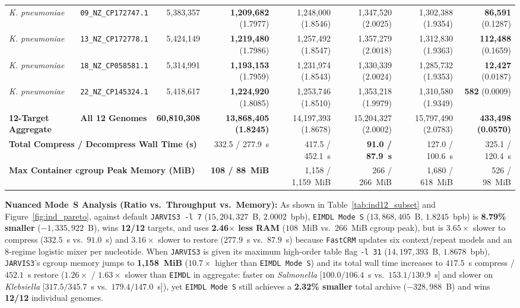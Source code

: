 \documentclass[10pt]{article}
\theoremstyle{definition}
\begin{document}
\begin{table}[h!]
{\begin{tabular}{llrrrrrr}
\textit{K. pneumoniae} & \texttt{09\_NZ\_CP172747.1} & 5,383,357 & \textbf{1,209,682} (1.7977) & 1,248,000 (1.8546) & 1,347,520 (2.0025) & 1,302,388 (1.9354) & \textbf{86,591} (0.1287) \\
\textit{K. pneumoniae} & \texttt{13\_NZ\_CP172778.1} & 5,424,149 & \textbf{1,219,480} (1.7986) & 1,257,492 (1.8547) & 1,357,279 (2.0018) & 1,312,830 (1.9363) & \textbf{112,488} (0.1659) \\
\textit{K. pneumoniae} & \texttt{18\_NZ\_CP058581.1} & 5,314,991 & \textbf{1,193,153} (1.7959) & 1,231,974 (1.8543) & 1,330,339 (2.0024) & 1,285,732 (1.9353) & \textbf{12,427} (0.0187) \\
\textit{K. pneumoniae} & \texttt{22\_NZ\_CP145324.1} & 5,418,617 & \textbf{1,224,920} (1.8085) & 1,253,746 (1.8510) & 1,353,218 (1.9979) & 1,310,580 (1.9349) & \textbf{582} (0.0009) \\
\midrule
\textbf{12-Target Aggregate} & \textbf{All 12 Genomes} & \textbf{60,810,308} & \textbf{13,868,405 (1.8245)} & 14,197,393 (1.8678) & 15,204,327 (2.0002) & 15,797,490 (2.0783) & \textbf{433,498 (0.0570)} \\
\midrule
\multicolumn{3}{l}{\textbf{Total Compress / Decompress Wall Time (s)}} & 332.5 / 277.9~s & 417.5 / 452.1~s & \textbf{91.0 / 87.9~s} & 127.0 / 100.6~s & 325.1 / 120.4~s \\
\multicolumn{3}{l}{\textbf{Max Container cgroup Peak Memory (MiB)}} & \textbf{108 / 88~MiB} & 1,158 / 1,159~MiB & 266 / 266~MiB & 1,680 / 618~MiB & 526 / 98~MiB \\
\bottomrule
\end{tabular}%
}
\end{table}

\noindent
\textbf{Nuanced Mode~S Analysis (Ratio vs.\ Throughput vs.\ Memory):}
As shown in Table~\ref{tab:ind12_subset} and Figure~\ref{fig:ind_pareto}, against default \texttt{JARVIS3 -l 7} ($15,204,327$~B, $2.0002$~bpb), \texttt{EIMDL Mode~S} ($13,868,405$~B, $1.8245$~bpb) is \textbf{8.79\% smaller} ($-1,335,922$~B), wins \textbf{12/12} targets, and uses \textbf{2.46$\times$ less RAM} ($108$~MiB vs.\ $266$~MiB cgroup peak), but is $3.65\times$ slower to compress ($332.5$~s vs.\ $91.0$~s) and $3.16\times$ slower to restore ($277.9$~s vs.\ $87.9$~s) because \texttt{FastCRM} updates six context/repeat models and an 8-regime logistic mixer per nucleotide. When \texttt{JARVIS3} is given its maximum high-order table flag \texttt{-l 31} ($14,197,393$~B, $1.8678$~bpb), \texttt{JARVIS3}'s cgroup memory jumps to \textbf{1,158~MiB} ($10.7\times$ higher than \texttt{EIMDL Mode~S}) and its total wall time increases to $417.5$~s compress / $452.1$~s restore ($1.26\times$ / $1.63\times$ slower than \texttt{EIMDL} in aggregate: faster on \textit{Salmonella} [$100.0/106.4$~s vs.\ $153.1/130.9$~s] and slower on \textit{Klebsiella} [$317.5/345.7$~s vs.\ $179.4/147.0$~s]), yet \texttt{EIMDL Mode~S} still achieves a \textbf{2.32\% smaller} total archive ($-328,988$~B) and wins \textbf{12/12} individual genomes.
\end{document}
